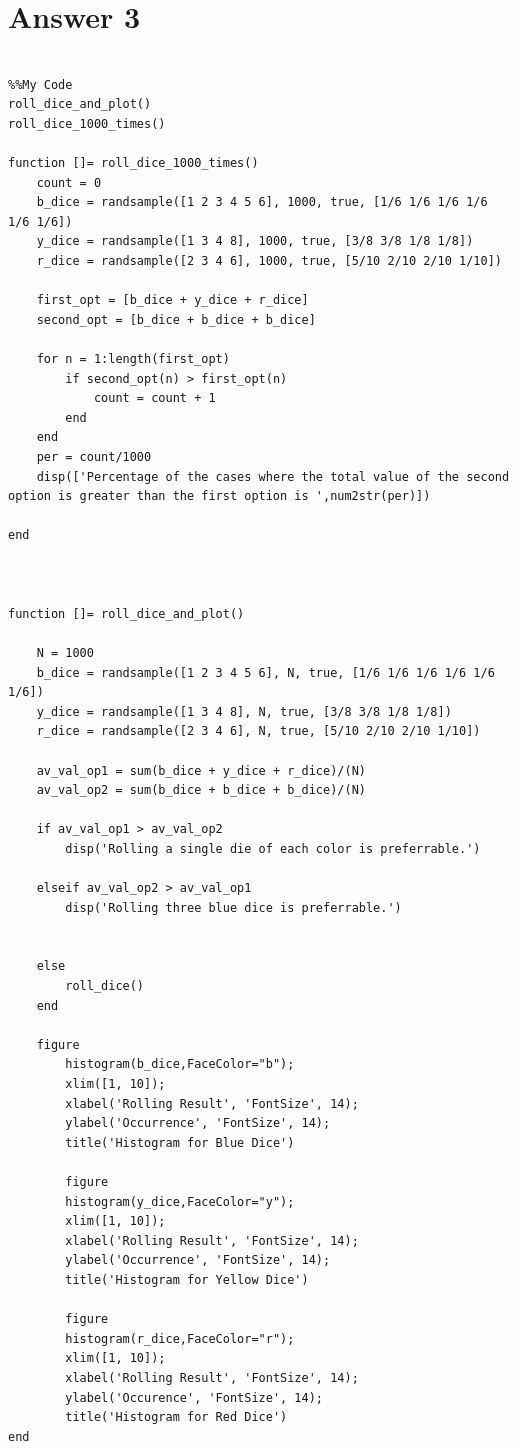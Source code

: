 \documentclass[12pt]{article}
\begin{document}
\section*{Answer 3}

\begin{lstlisting}[style=Matlab-editor]

%%My Code
roll_dice_and_plot()
roll_dice_1000_times()

function []= roll_dice_1000_times()
    count = 0
    b_dice = randsample([1 2 3 4 5 6], 1000, true, [1/6 1/6 1/6 1/6 1/6 1/6])
    y_dice = randsample([1 3 4 8], 1000, true, [3/8 3/8 1/8 1/8])
    r_dice = randsample([2 3 4 6], 1000, true, [5/10 2/10 2/10 1/10])

    first_opt = [b_dice + y_dice + r_dice]
    second_opt = [b_dice + b_dice + b_dice]

    for n = 1:length(first_opt)
        if second_opt(n) > first_opt(n) 
            count = count + 1
        end
    end
    per = count/1000
    disp(['Percentage of the cases where the total value of the second option is greater than the first option is ',num2str(per)])

end



function []= roll_dice_and_plot()
    
    N = 1000
    b_dice = randsample([1 2 3 4 5 6], N, true, [1/6 1/6 1/6 1/6 1/6 1/6])
    y_dice = randsample([1 3 4 8], N, true, [3/8 3/8 1/8 1/8])
    r_dice = randsample([2 3 4 6], N, true, [5/10 2/10 2/10 1/10])
    
    av_val_op1 = sum(b_dice + y_dice + r_dice)/(N)
    av_val_op2 = sum(b_dice + b_dice + b_dice)/(N)
    
    if av_val_op1 > av_val_op2
        disp('Rolling a single die of each color is preferrable.')
    
    elseif av_val_op2 > av_val_op1
        disp('Rolling three blue dice is preferrable.')
        

    else
        roll_dice()
    end

    figure
        histogram(b_dice,FaceColor="b");
        xlim([1, 10]);
        xlabel('Rolling Result', 'FontSize', 14);
        ylabel('Occurrence', 'FontSize', 14);
        title('Histogram for Blue Dice')
        
        figure
        histogram(y_dice,FaceColor="y");
        xlim([1, 10]);
        xlabel('Rolling Result', 'FontSize', 14);
        ylabel('Occurrence', 'FontSize', 14);
        title('Histogram for Yellow Dice')
        
        figure
        histogram(r_dice,FaceColor="r");
        xlim([1, 10]);
        xlabel('Rolling Result', 'FontSize', 14);
        ylabel('Occurence', 'FontSize', 14);
        title('Histogram for Red Dice')
end
\end{lstlisting}
\end{document}
